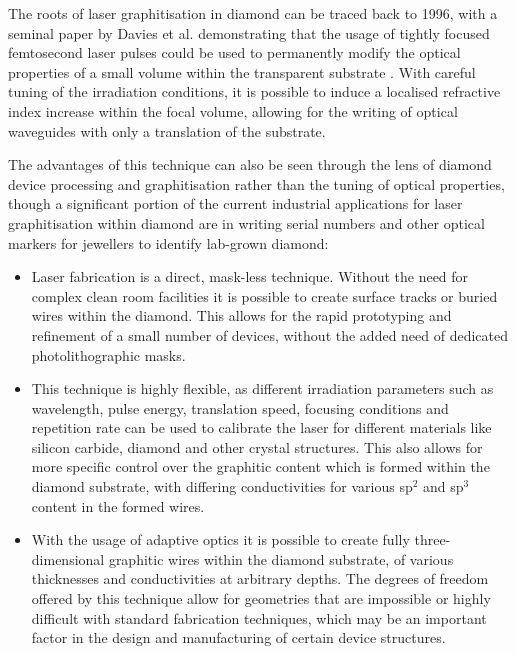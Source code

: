 \begin{refsection}

The roots of laser graphitisation in diamond can be traced back to 1996, with a seminal paper by Davies et al. demonstrating that the usage of tightly focused femtosecond laser pulses could be used to permanently modify the optical properties of a small volume within the transparent substrate \cite{davies:1996}. With careful tuning of the irradiation conditions, it is possible to induce a localised refractive index increase within the focal volume, allowing for the writing of optical waveguides with only a translation of the substrate. 

The advantages of this technique can also be seen through the lens of diamond device processing and graphitisation rather than the tuning of optical properties, though a significant portion of the current industrial applications for laser graphitisation within diamond are in writing serial numbers and other optical markers for jewellers to identify lab-grown diamond:

\begin{itemize}
	\item Laser fabrication is a direct, mask-less technique. Without the need for complex clean room facilities it is possible to create surface tracks or buried wires within the diamond. This allows for the rapid prototyping and refinement of a small number of devices, without the added need of dedicated photolithographic masks.
	\item This technique is highly flexible, as different irradiation parameters such as wavelength, pulse energy, translation speed, focusing conditions and repetition rate can be used to calibrate the laser for different materials like silicon carbide, diamond and other crystal structures. This also allows for more specific control over the graphitic content which is formed within the diamond substrate, with differing conductivities for various sp$^{2}$ and sp$^{3}$ content in the formed wires.
	\item With the usage of adaptive optics it is possible to create fully three-dimensional graphitic wires within the diamond substrate, of various thicknesses and conductivities at arbitrary depths. The degrees of freedom offered by this technique allow for geometries that are impossible or highly difficult with standard fabrication techniques, which may be an important factor in the design and manufacturing of certain device structures. 
\end{itemize}


\end{refsection}
